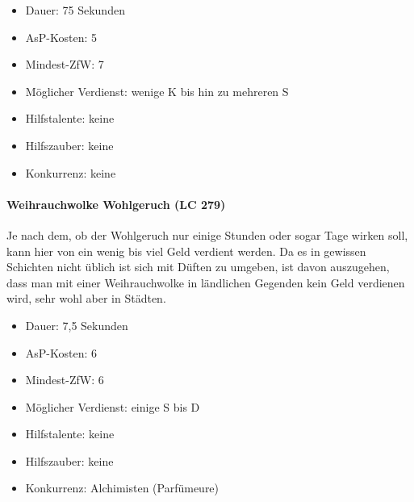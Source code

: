\begin{itemize}
	\item Dauer: 75 Sekunden
	\item AsP-Kosten: 5
	\item Mindest-ZfW: 7
	\item Möglicher Verdienst: wenige K bis hin zu mehreren S
	\item Hilfstalente: keine
	\item Hilfszauber: keine
	\item Konkurrenz: keine
\end{itemize}

\paragraph{Weihrauchwolke Wohlgeruch (LC 279)}
Je nach dem, ob der Wohlgeruch nur einige Stunden oder sogar Tage wirken soll, kann hier von ein wenig bis viel Geld verdient werden. Da es in gewissen Schichten nicht üblich ist sich mit Düften zu umgeben, ist davon auszugehen, dass man mit einer Weihrauchwolke in ländlichen Gegenden kein Geld verdienen wird, sehr wohl aber in Städten.

\begin{itemize}
	\item Dauer: 7,5 Sekunden
	\item AsP-Kosten: 6
	\item Mindest-ZfW: 6
	\item Möglicher Verdienst: einige S bis D
	\item Hilfstalente: keine
	\item Hilfszauber: keine
	\item Konkurrenz: Alchimisten (Parfümeure)
\end{itemize}
